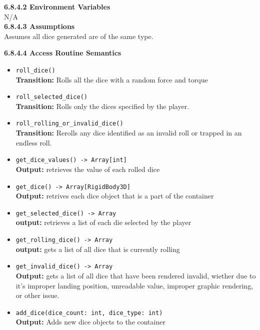 \documentclass[12pt, titlepage]{article}
\begin{document}
\textbf{6.8.4.2 Environment Variables}\\

N/A\\

\textbf{6.8.4.3 Assumptions}\\
Assumes all dice generated are of the same type.

\textbf{6.8.4.4 Access Routine Semantics}
\begin{itemize}
	\item \texttt{roll\_dice() }\\
    	\textbf{Transition:} Rolls all the dice with a random force and torque
	
	\item \texttt{roll\_selected\_dice() }\\
	\textbf{Transition:} Rolls only the dices specified by the player. 
	
	\item \texttt{roll\_rolling\_or\_invalid\_dice() }\\
	\textbf{Transition:} Rerolls any dice identified as an invalid roll or trapped in an endless roll.
	
	\item \texttt{get\_dice\_values() -> Array[int]}\\
	\textbf{Output:} retrieves the value of each rolled dice
	
	\item \texttt{get\_dice() -> Array[RigidBody3D] }\\
	\textbf{Output:} retrives each dice object that is a part of the container
	
	\item \texttt{get\_selected\_dice() -> Array }\\
	\textbf{output:} retrieves a list of each die selected by the player
	
	\item \texttt{get\_rolling\_dice() -> Array}\\
	\textbf{output:} gets a list of all dice that is currently rolling
	
	\item \texttt{get\_invalid\_dice() -> Array }\\
	\textbf{Output:} gets a list of all dice that have been rendered invalid, wiether due to it's improper landing position, unreadable value, improper graphic rendering, or other issue.
	
	\item \texttt{add\_dice(dice\_count: int, dice\_type: int)}\\
	\textbf{Output:} Adds new dice objects to the container
	

\end{itemize}
\end{document}

